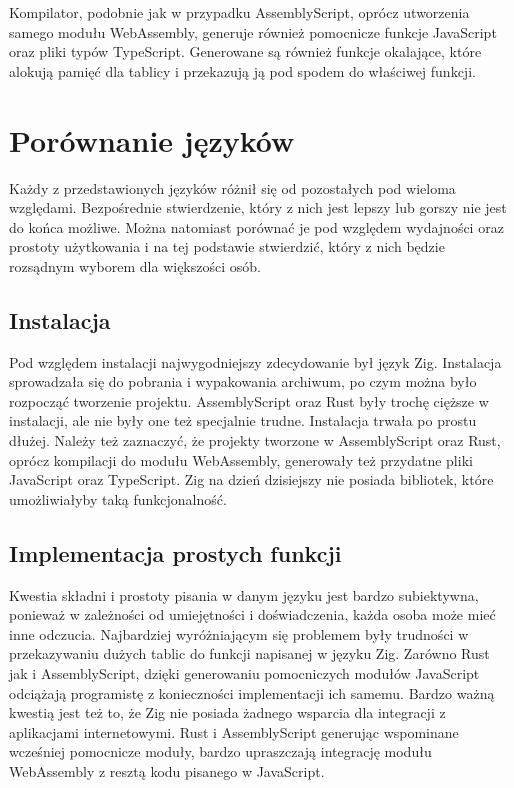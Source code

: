 \documentclass[language=polish,type=master]{aghmodern}
\begin{document}
Kompilator, podobnie jak w przypadku AssemblyScript, oprócz utworzenia samego modułu WebAssembly, generuje również pomocnicze funkcje JavaScript oraz pliki typów TypeScript.
Generowane są również funkcje okalające, które alokują pamięć dla tablicy i przekazują ją pod spodem do właściwej funkcji.

\section{Porównanie języków}
Każdy z przedstawionych języków różnił się od pozostałych pod wieloma względami.
Bezpośrednie stwierdzenie, który z nich jest lepszy lub gorszy nie jest do końca możliwe.
Można natomiast porównać je pod względem wydajności oraz prostoty użytkowania i na tej podstawie stwierdzić, który z nich będzie rozsądnym wyborem dla większości osób.

\subsection{Instalacja}
Pod względem instalacji najwygodniejszy zdecydowanie był język Zig.
Instalacja sprowadzała się do pobrania i wypakowania archiwum, po czym można było rozpocząć tworzenie projektu.
AssemblyScript oraz Rust były trochę cięższe w instalacji, ale nie były one też specjalnie trudne.
Instalacja trwała po prostu dłużej.
Należy też zaznaczyć, że projekty tworzone w AssemblyScript oraz Rust, oprócz kompilacji do modułu WebAssembly, generowały też przydatne pliki JavaScript oraz TypeScript.
Zig na dzień dzisiejszy nie posiada bibliotek, które umożliwiałyby taką funkcjonalność.

\subsection{Implementacja prostych funkcji}
Kwestia składni i prostoty pisania w danym języku jest bardzo subiektywna, ponieważ w zależności od umiejętności i doświadczenia, każda osoba może mieć inne odczucia.
Najbardziej wyróżniającym się problemem były trudności w przekazywaniu dużych tablic do funkcji napisanej w języku Zig.
Zarówno Rust jak i AssemblyScript, dzięki generowaniu pomocniczych modułów JavaScript odciążają programistę z konieczności implementacji ich samemu.
Bardzo ważną kwestią jest też to, że Zig nie posiada żadnego wsparcia dla integracji z aplikacjami internetowymi.
Rust i AssemblyScript generując wspominane wcześniej pomocnicze moduły, bardzo upraszczają integrację modułu WebAssembly z resztą kodu pisanego w JavaScript.
\end{document}

